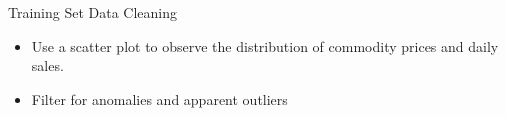\documentclass[
 size=14pt,
 paper=smartboard,  %
 mode=present, 		%
 display=slides, 	%
 style=tuliplab,  	%
 pauseslide,
 fleqn,leqno]{powerdot}
\begin{document}
\begin{slide}[toc=,bm=]{Training Set Data Cleaning}
\begin{itemize}
\item Use a scatter plot to observe the distribution of commodity prices and daily sales.
\item Filter for anomalies and apparent outliers
\end{itemize}



\end{slide}
\end{document}
